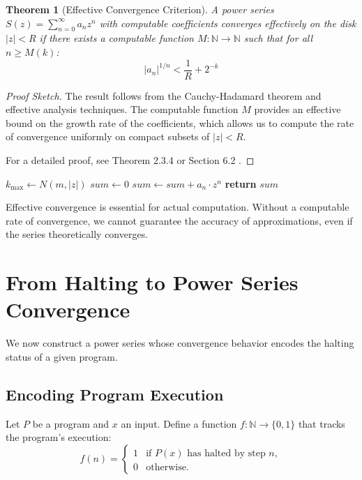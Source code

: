 \documentclass[12pt, a4paper]{article}
\newtheorem{theorem}{Theorem}
\begin{document}
\begin{theorem}[Effective Convergence Criterion]
A power series $S(z) = \sum_{n=0}^{\infty} a_n z^n$ with computable coefficients converges effectively on the disk $|z| < R$ if there exists a computable function $M: \mathbb{N} \to \mathbb{N}$ such that for all $n \geq M(k)$:
\[
|a_n|^{1/n} < \frac{1}{R} + 2^{-k}
\]
\end{theorem}

\begin{proof}[Proof Sketch]
The result follows from the Cauchy-Hadamard theorem and effective analysis techniques. The computable function $M$ provides an effective bound on the growth rate of the coefficients, which allows us to compute the rate of convergence uniformly on compact subsets of $|z| < R$.

For a detailed proof, see Theorem 2.3.4 \cite{pourel1989computable} or Section 6.2 \cite{weihrauch2000computable}.

\end{proof}

\begin{algorithm}
\caption{Effective computation of power series partial sums}
\begin{algorithmic}[1]
\State {}
\State $k_{\text{max}} \gets N(m, |z|)$
\State $sum \gets 0$
\State $sum \gets sum + a_n \cdot z^n$
\EndFor
\State \textbf{return} $sum$ 
\EndProcedure
\end{algorithmic}
\end{algorithm}

Effective convergence is essential for actual computation. Without a computable rate of convergence, we cannot guarantee the accuracy of approximations, even if the series theoretically converges.

\section{From Halting to Power Series Convergence}

We now construct a power series whose convergence behavior encodes the halting status of a given program.

\subsection{Encoding Program Execution}
Let $P$ be a program and $x$ an input. Define a function $f: \mathbb{N} \to \{0,1\}$ that tracks the program's execution:
\[
f(n) = 
\begin{cases}
1 & \text{if } P(x) \text{ has halted by step } n, \\
0 & \text{otherwise}.
\end{cases}
\]
\end{document}
